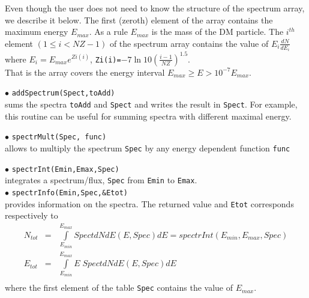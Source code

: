 \documentclass[12pt,a4paper]{article}
\begin{document}
Even though the user does not need to know the structure of the  spectrum array, we describe it below.
The first (zeroth) element of the array contains the maximum energy $E_{max}$. As a rule   $E_{max}$ is the mass of the DM particle.    
The $i^{th}$ element $(1\le i < NZ-1)$ of the spectrum array contains
the value of $E_i \frac{ dN}{dE_i} $ where  $E_i=E_{max} e^{Zi(i)}$,   
\verb|Zi(i)=|$ -7 \ln 10 \left(\frac{i-1}{NZ}\right)^{1.5}$.\\
 That is the array  covers the  energy interval  $E_{max} \ge E > 10^{-7}E_{max}$. 

\noindent
$\bullet$ \verb|addSpectrum(Spect,toAdd)|\\
sums the  spectra \verb|toAdd|  and \verb|Spect| and writes the result in \verb|Spect|. For example, this routine can be useful for summing spectra 
with different  maximal energy.


\noindent
$\bullet$ \verb|spectrMult(Spec, func)|\\
allows to multiply the spectrum \verb|Spec| by any energy dependent function \verb|func|

\noindent
$\bullet$ \verb|spectrInt(Emin,Emax,Spec) | \\
integrates a spectrum/flux, \verb|Spec| from {\tt Emin} to  {\tt Emax}.\\
\noindent
$\bullet$ \verb|spectrInfo(Emin,Spec,&Etot)|\\
provides information on the spectra. The  returned value and \verb|Etot| corresponds respectively to   
\begin{eqnarray}
\nonumber
  N_{tot}&=&\int \limits_{E_{min}}^{E_{max}} SpectdNdE(E,Spec) dE = spectrInt(E_{min},E_{max},Spec) \\ 
\nonumber
  E_{tot}&=&  \int \limits_{E_{min}}^{E_{max}} E\; SpectdNdE(E,Spec)dE\\
\nonumber
 \end{eqnarray}
where the first element of the table {\tt Spec} contains the value of   $E_{max}$.
\end{document}
